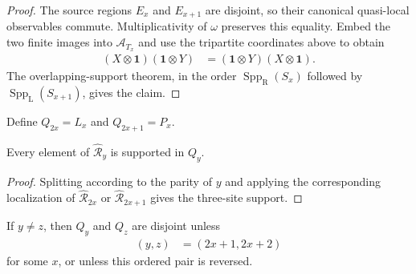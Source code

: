 \begin{proof}\leanok
    The source regions $E_x$ and $E_{x+1}$ are disjoint, so their canonical
    quasi-local observables commute.  Multiplicativity of $\omega$ preserves
    this equality.  Embed the two finite images into $\mathcal A_{T_x}$ and
    use the tripartite coordinates above to obtain
    \begin{align}
        (X\otimes\mathbf 1)(\mathbf 1\otimes Y)
         & =(\mathbf 1\otimes Y)(X\otimes\mathbf 1).
    \end{align}
    The overlapping-support theorem, in the order
    $\operatorname{Spp}_{\mathrm R}(S_x)$ followed by
    $\operatorname{Spp}_{\mathrm L}(S_{x+1})$, gives the claim.
\end{proof}

\begin{definition}
    \label{def:qca_support_algebra_region}
    \leanok
    Define $Q_{2x}=L_x$ and $Q_{2x+1}=P_x$.
\end{definition}

\begin{lemma}
    \label{thm:qca_unified_support_algebra_region}
    \leanok
    Every element of $\widehat{\mathcal R}_y$ is supported in $Q_y$.
\end{lemma}

\begin{proof}\leanok
    Splitting according to the parity of $y$ and applying the corresponding
    localization of $\widehat{\mathcal R}_{2x}$ or
    $\widehat{\mathcal R}_{2x+1}$ gives the three-site support.
\end{proof}

\begin{lemma}
    \label{thm:qca_support_region_overlap_classification}
    \leanok
    If $y\ne z$, then $Q_y$ and $Q_z$ are disjoint unless
    \begin{align}
        (y,z) & =(2x+1,2x+2)
    \end{align}
    for some $x$, or unless this ordered pair is reversed.
\end{lemma}

